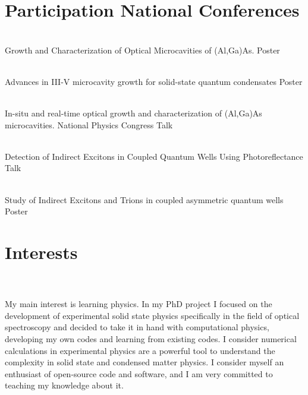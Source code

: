 \documentclass[letterpaper]{twentysecondcv} %
\begin{document}
\section{Participation National Conferences}

\begin{twenty} %
	                 {\\Growth and Characterization of Optical Microcavities of (Al,Ga)As.}
                     {Poster}
                     
   {\\ Advances in III-V microcavity growth for solid-state quantum condensates}
   {Poster}
  

\end{twenty}



\begin{twenty}
	{\\ In-situ and real-time optical growth and characterization of (Al,Ga)As microcavities.
		National Physics Congress
	}
	{Talk}
	
	{\\ Detection of Indirect Excitons in Coupled Quantum Wells Using Photoreflectance}
	{Talk}
	
	{\\Study of Indirect Excitons and Trions in coupled asymmetric quantum wells}
	{Poster}
\end{twenty}



\section{Interests}
\\\\
My main interest is learning physics. In my PhD project I focused on the development of experimental solid state physics specifically in the field of optical spectroscopy and decided to take it in hand with computational physics, developing my own codes and learning from existing codes. I consider numerical calculations in experimental physics are a powerful tool to understand the complexity in solid state and condensed matter physics. I consider myself an enthusiast of open-source code and software, and I am very committed to teaching my knowledge about it.
\end{document}
